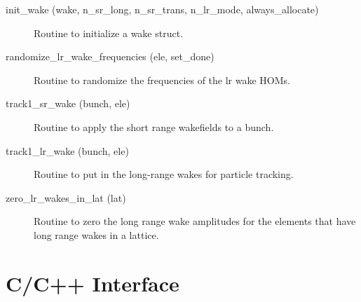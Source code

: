 \begin{description}

\label{r:init.wake}
\item[init_wake (wake, n_sr_long, n_sr_trans, n_lr_mode, always_allocate)] \Newline 
Routine to initialize a wake struct.

\label{r:randomize.lr.wake.frequencies}
\item[randomize_lr_wake_frequencies (ele, set_done)] \Newline 
Routine to randomize the frequencies of the lr wake HOMs.

\label{r:track1.sr.wake}
\item[track1_sr_wake (bunch, ele)] \Newline 
Routine to apply the short range wakefields to a bunch. 

\label{r:track1.lr.wake}
\item[track1_lr_wake (bunch, ele)] \Newline 
Routine to put in the long-range wakes for particle tracking.

\label{r:zero.lr.wakes.in.lat}
\item[zero_lr_wakes_in_lat (lat)] \Newline 
Routine to zero the long range wake amplitudes for the elements that have
long range wakes in a lattice.

\end{description}

\section{C/C++ Interface}
\label{r:c.interface}  

